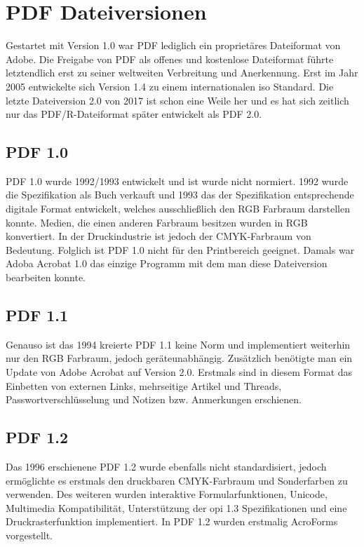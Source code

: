 \section{PDF Dateiversionen}
Gestartet mit Version 1.0 war PDF lediglich ein proprietäres Dateiformat von Adobe. Die Freigabe von PDF als offenes und kostenlose Dateiformat führte letztendlich erst zu seiner weltweiten Verbreitung und Anerkennung. Erst im Jahr 2005 entwickelte sich Version 1.4 zu einem internationalen \gls{iso} Standard. Die letzte Dateiversion 2.0 von 2017 ist schon eine Weile her und es hat sich zeitlich nur das PDF/R-Dateiformat später entwickelt als PDF 2.0.

\subsection{PDF 1.0}
PDF 1.0 wurde 1992/1993 entwickelt und ist wurde nicht normiert. 1992 wurde die Spezifikation als Buch verkauft und 1993 das der Spezifikation entsprechende digitale Format entwickelt, welches ausschließlich den RGB Farbraum darstellen konnte. Medien, die einen anderen Farbraum besitzen wurden in RGB konvertiert. In der Druckindustrie ist jedoch der CMYK-Farbraum von Bedeutung. Folglich ist PDF 1.0 nicht für den Printbereich geeignet. Damals war Adoba Acrobat 1.0 das einzige Programm mit dem man diese Dateiversion bearbeiten konnte. \cite{proj-consult}

\subsection{PDF 1.1}
Genauso ist das 1994 kreierte PDF 1.1 keine Norm und implementiert weiterhin nur den RGB Farbraum, jedoch geräteunabhängig. Zusätzlich benötigte man ein Update von Adobe Acrobat auf Version 2.0. Erstmals sind in diesem Format das Einbetten von externen Links, mehrseitige Artikel und Threads, Passwortverschlüsselung und Notizen bzw. Anmerkungen erschienen. \cite{proj-consult}

\subsection{PDF 1.2}
Das 1996 erschienene PDF 1.2 wurde ebenfalls nicht standardisiert, jedoch ermöglichte es erstmals den druckbaren CMYK-Farbraum und Sonderfarben zu verwenden. Des weiteren wurden interaktive Formularfunktionen, Unicode, Multimedia Kompatibilität, Unterstützung der \gls{opi} 1.3 Spezifikationen und eine Druckrasterfunktion implementiert. \cite{proj-consult} In PDF 1.2 wurden erstmalig AcroForms vorgestellt.

